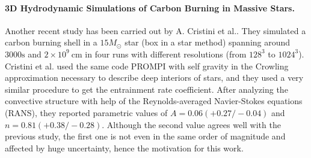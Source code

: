 \paragraph{3D Hydrodynamic Simulations of Carbon Burning in Massive Stars. \citet{cristini}} 
Another recent study has been carried out by A. Cristini et al.. They simulated a carbon burning shell in a $15 M_{\odot}$ star (box in a star method) spanning around $3000 \mathrm{s}$ and $2 \times 10^9 \ \mathrm{cm}$  in four runs with different resolutions (from $128^3$ to $1024^3$). Cristini et al. used the same code PROMPI with self gravity in the Crowling approximation necessary to describe deep interiors of stars, and they used a very similar procedure to get the entrainment rate coefficient. After analyzing the convective structure with help of the Reynolds-averaged Navier-Stokes equations (RANS), they reported parametric values of $A= 0.06 (+0.27 / -0.04)$ and $n= 0.81 (+0.38 / -0.28)$. Although the second value agrees well with the previous study, the first one is not even in the same order of magnitude and affected by huge uncertainty, hence the motivation for this work.
